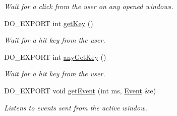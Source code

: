 \begin{DoxyCompactItemize}
\begin{DoxyCompactList}\small\item\em Wait for a click from the user on any opened windows. \end{DoxyCompactList}\item 
D\-O\-\_\-\-E\-X\-P\-O\-R\-T int \hyperlink{group___window_management_ga04118983b3f8f6a27943ecf1cae68e84}{get\-Key} ()
\begin{DoxyCompactList}\small\item\em Wait for a hit key from the user. \end{DoxyCompactList}\item 
D\-O\-\_\-\-E\-X\-P\-O\-R\-T int \hyperlink{group___window_management_ga74599c45badec95e5a89d49c843ed09a}{any\-Get\-Key} ()
\begin{DoxyCompactList}\small\item\em Wait for a hit key from the user. \end{DoxyCompactList}\item 
\hypertarget{group___window_management_ga6c3fd81bfb6ea6b78349aa8cd0455061}{D\-O\-\_\-\-E\-X\-P\-O\-R\-T void \hyperlink{group___window_management_ga6c3fd81bfb6ea6b78349aa8cd0455061}{get\-Event} (int ms, \hyperlink{struct_d_o_1_1_event}{Event} \&e)}\label{group___window_management_ga6c3fd81bfb6ea6b78349aa8cd0455061}

\begin{DoxyCompactList}\small\item\em Listens to events sent from the active window. \end{DoxyCompactList}\end{DoxyCompactItemize}
